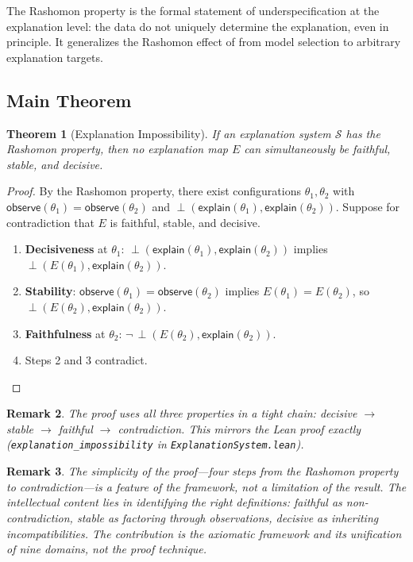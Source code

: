\documentclass[11pt,a4paper]{article}
\newtheorem{theorem}{Theorem}[section]
\newtheorem{remark}[theorem]{Remark}
\newcommand{\incomp}{\perp}
\begin{document}
The Rashomon property is the formal statement of underspecification at the
explanation level: the data do not uniquely determine the explanation, even in
principle.  It generalizes the Rashomon effect of
\citet{rudin2024amazing,fisher2019models} from model selection to arbitrary
explanation targets.

\subsection{Main Theorem}

\begin{theorem}[Explanation Impossibility]
\label{thm:universal}
If an explanation system $\mathcal{S}$ has the Rashomon property, then no
explanation map $E$ can simultaneously be faithful, stable, and decisive.
\end{theorem}

\begin{proof}
By the Rashomon property, there exist configurations $\theta_1, \theta_2$ with
$\mathsf{observe}(\theta_1) = \mathsf{observe}(\theta_2)$ and
$\incomp(\mathsf{explain}(\theta_1), \mathsf{explain}(\theta_2))$.
Suppose for contradiction that $E$ is faithful, stable, and decisive.
\begin{enumerate}
  \item \textbf{Decisiveness} at $\theta_1$:
    $\incomp(\mathsf{explain}(\theta_1), \mathsf{explain}(\theta_2))$
    implies
    $\incomp(E(\theta_1), \mathsf{explain}(\theta_2))$.
  \item \textbf{Stability}:
    $\mathsf{observe}(\theta_1) = \mathsf{observe}(\theta_2)$
    implies $E(\theta_1) = E(\theta_2)$, so
    $\incomp(E(\theta_2), \mathsf{explain}(\theta_2))$.
  \item \textbf{Faithfulness} at $\theta_2$:
    $\neg\,\incomp(E(\theta_2), \mathsf{explain}(\theta_2))$.
  \item Steps 2 and 3 contradict.  \qedhere
\end{enumerate}
\end{proof}

\begin{remark}
The proof uses all three properties in a tight chain:
decisive $\to$ stable $\to$ faithful $\to$ contradiction.
This mirrors the Lean proof exactly (\texttt{explanation\_impossibility} in
\texttt{ExplanationSystem.lean}).
\end{remark}

\begin{remark}
The simplicity of the proof---four steps from the Rashomon
property to contradiction---is a feature of the framework, not a
limitation of the result.  The intellectual content lies in identifying the
right definitions: faithful as non-contradiction, stable as factoring
through observations, decisive as inheriting incompatibilities.  The
contribution is the axiomatic framework and its unification of nine
domains, not the proof technique.
\end{remark}
\end{document}
